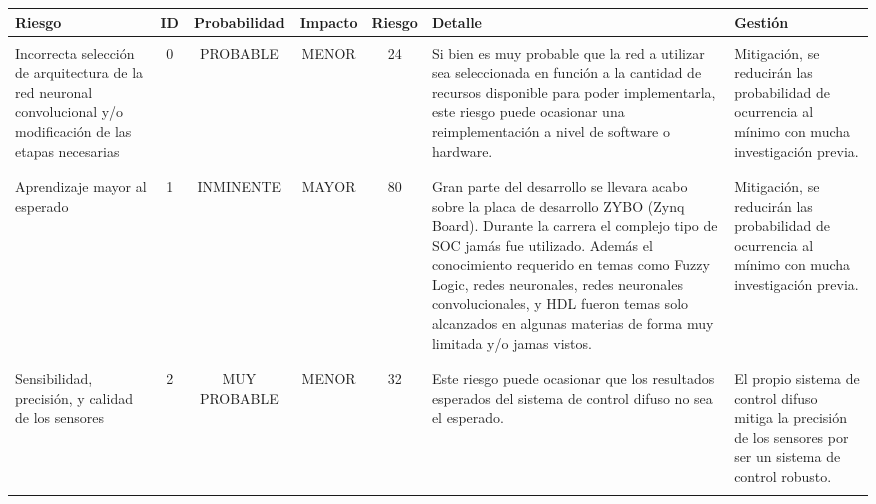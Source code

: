     \begin{table}[h!]
        \scriptsize
        \hspace{-1.5cm}
        \begin{tabular}{ p{3cm} c c c c p{4cm} p{4cm} }
            \\\hline 
            \bf \bf Riesgo & \bf ID & \bf Probabilidad & \bf Impacto & \bf Riesgo & \bf Detalle & \bf Gestión \\
            \hline
            
            &&&&&&\\
            Incorrecta selección de arquitectura de la red neuronal convolucional y/o modificación de las etapas necesarias &
            0 &
            PROBABLE &
            MENOR &
            24\cellcolor{yellow} &
            Si bien es muy probable que la red a utilizar sea seleccionada en función a la cantidad de recursos disponible para poder implementarla, este riesgo puede ocasionar una reimplementación a nivel de software o hardware.  & 
            Mitigación, se reducirán las probabilidad de ocurrencia al mínimo con mucha investigación previa. 
            \\\\\hline 
            
            &&&&&&\\
            Aprendizaje mayor al esperado &
            1 &
            INMINENTE &
            MAYOR &
            80\cellcolor{red} &
            Gran parte del desarrollo se llevara acabo sobre la placa de desarrollo ZYBO (Zynq Board). Durante la carrera el complejo tipo de SOC jamás fue utilizado. 
            Además el conocimiento requerido en temas como Fuzzy Logic, redes neuronales, redes neuronales convolucionales, y HDL fueron temas solo alcanzados en algunas materias de forma muy limitada y/o jamas vistos.  & 
            Mitigación, se reducirán las probabilidad de ocurrencia al mínimo con mucha investigación previa. 
            \\\\\hline 

            &&&&&&\\
            Sensibilidad, precisión, y calidad de los sensores &
            2 &
            MUY PROBABLE &
            MENOR &
            32\cellcolor{yellow} &
            Este riesgo puede ocasionar que los resultados esperados del sistema de control difuso no sea el esperado.  & 
            El propio sistema de control difuso mitiga la precisión de los sensores por ser un sistema de control robusto.  
            \\\\\hline 
            

\end{tabular}
\end{table}
